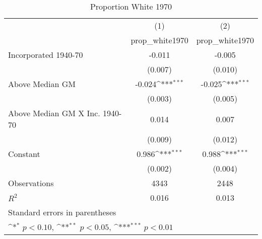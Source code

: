 \begin{table}[htbp]\centering
\def\sym#1{\ifmmode^{#1}\else\(^{#1}\)\fi}
\caption{Proportion White 1970}
\begin{tabular}{l*{2}{c}}
\hline\hline
                    &\multicolumn{1}{c}{(1)}&\multicolumn{1}{c}{(2)}\\
                    &\multicolumn{1}{c}{prop\_white1970}&\multicolumn{1}{c}{prop\_white1970}\\
\hline
Incorporated 1940-70&      -0.011         &      -0.005         \\
                    &     (0.007)         &     (0.010)         \\
[1em]
Above Median GM     &      -0.024\sym{***}&      -0.025\sym{***}\\
                    &     (0.003)         &     (0.005)         \\
[1em]
Above Median GM X Inc. 1940-70&       0.014         &       0.007         \\
                    &     (0.009)         &     (0.012)         \\
[1em]
Constant            &       0.986\sym{***}&       0.988\sym{***}\\
                    &     (0.002)         &     (0.004)         \\
\hline
Observations        &        4343         &        2448         \\
\(R^{2}\)           &       0.016         &       0.013         \\
\hline\hline
\multicolumn{3}{l}{\footnotesize Standard errors in parentheses}\\
\multicolumn{3}{l}{\footnotesize \sym{*} \(p<0.10\), \sym{**} \(p<0.05\), \sym{***} \(p<0.01\)}\\
\end{tabular}
\end{table}
